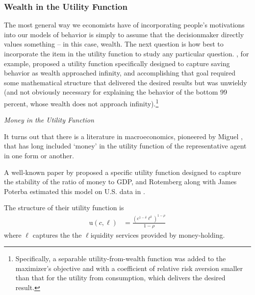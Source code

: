 \documentclass{article}
\newcommand{\CRRA}{\rho}
\newcommand{\uFunc}{\mathrm{u}}
\newcommand{\cNrm}{c}
\newcommand{\lqdt}{\ell}
\begin{document}
\subsubsection{Wealth in the Utility Function}


The most general way we economists have of incorporating people's motivations into our models of behavior is simply to assume that the decisionmaker directly values something -- in this case, wealth. The next question is how best to incorporate the item in the utility function to study any particular question.  \cite{WhyDoTheRich}, for example, proposed a utility function specifically designed to capture saving behavior as wealth approached infinity, and accomplishing that goal required some mathematical structure that delivered the desired results but was unwieldy (and not obviously necessary for explaining the behavior of the bottom 99 percent, whose wealth does not approach infinity).\footnote{Specifically, a separable utility-from-wealth function was added to the maximizer's objective and with a coefficient of relative risk aversion smaller than that for the utility from consumption, which delivers the desired result.}

\textit{Money in the Utility Function}

It turns out that there is a literature in macroeconomics, pioneered by Miguel \cite{sidrauski1967rational}, that has long included `money' in the utility function of the representative agent in one form or another.

A well-known paper by \cite{Rotemberg_1984} proposed a specific utility function designed to capture the stability of the ratio of money to GDP, and Rotemberg along with James Poterba estimated this model on U.S. data in \cite{Poterba_1986}.

The structure of their utility function is
\begin{align}
    \uFunc(\cNrm,\lqdt) & = \frac{\left(
        \cNrm^{1-\delta}\lqdt^{\delta}
        \right)^{1-\CRRA}}{1-\CRRA}
\end{align}
where $\lqdt$ captures the the $\lqdt$iquidity services provided by money-holding.
\end{document}
